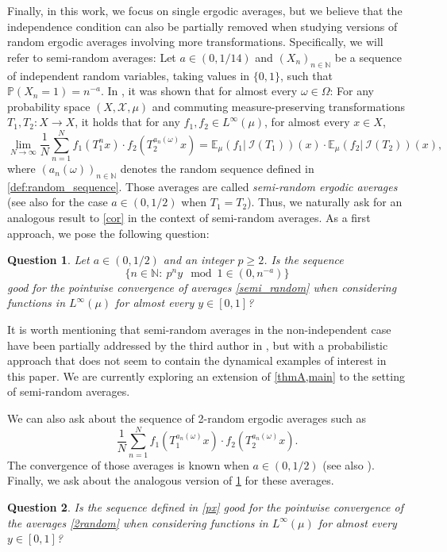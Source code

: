 \documentclass[11pt]{amsart}
\numberwithin{equation}{section}
\newtheorem{question}{Question}
\theoremstyle{definition}
\theoremstyle{plain}
\newcommand{\N}{{\mathbb N}}
\begin{document}
Finally, in this work, we focus on single ergodic averages, but we believe that the independence condition can also be partially removed when studying versions of random ergodic averages involving more transformations. Specifically, we will refer to semi-random averages: Let $a\in (0,1/14)$ and $(X_n)_{n\in\N}$ be a sequence of independent random variables, taking values in $\{0,1\}$, such that $\mathbb{P}(X_n=1)=n^{-a}$. In \cite{Frantzikinakis_Lesigne_Wierdl}, it was shown that for almost every $\omega\in \Omega$: For any probability space $(X,\mathcal{X},\mu)$ and commuting measure-preserving transformations $T_1,T_2\colon X\to X$, it holds that for any $f_1,f_2\in L^{\infty}(\mu)$, for almost every $x\in X$,
\begin{equation}\lim_{N\to\infty}\dfrac{1}{N}\sum_{n=1}^Nf_1(T_1^nx)\cdot f_2(T_2^{a_n(\omega)}x)=\mathbb{E}_\mu(f_1|\ \mathcal{I}(T_1))(x)\cdot\mathbb{E}_\mu(f_2|\ \mathcal{I}(T_2))(x),
    \label{semi_random}
\end{equation}
where $(a_n(\omega))_{n\in\N}$ denotes the random sequence defined in \cref{def:random_sequence}.
Those averages are called \emph{semi-random ergodic averages} (see also \cite{Frantzikinakis_Lesigne_Wierdl_Szemeredi} for the case $a\in (0,1/2)$ when $T_1=T_2$). Thus, we naturally ask for an analogous result to \cref{cor} in the context of semi-random averages. As a first approach, we pose the following question:
\begin{question}
    Let $a\in (0,1/2)$ and an integer $p\geq 2$. Is the sequence \begin{equation}
        \{n\in \N:\ p^ny\mod{1}\in (0,n^{-a})\}\label{px}
    \end{equation} good for the pointwise convergence of averages \eqref{semi_random} when considering functions in $L^\infty(\mu)$ for almost every $y\in [0,1]$?\label{Q:semi_random}
\end{question}
 It is worth mentioning that semi-random averages in the non-independent case have been partially addressed by the third author in \cite{Tesis}, but with a probabilistic approach that does not seem to contain the dynamical examples of interest in this paper. We are currently exploring an extension of \cref{thmA,main} to the setting of semi-random averages.

We can also ask about the sequence of 2-random ergodic averages such as
 \begin{equation}
     \dfrac{1}{N}\sum_{n=1}^Nf_1(T_1^{a_n(\omega)}x)\cdot f_2(T_2^{a_n(\omega)}x).\label{2random}
 \end{equation}
The convergence of those averages is known when $a\in (0,1/2)$  \cite{Frantzikinakis_Lesigne_Wierdl} (see also \cite{Frantzikinakis_Lesigne_Wierdl_Szemeredi}). Finally, we ask about the analogous version of  \cref{Q:semi_random} for these averages.
\begin{question}
    Is the sequence defined in \eqref{px} good for the pointwise convergence of the averages \eqref{2random} when considering functions in $L^\infty(\mu)$ for almost every $y\in [0,1]$?
\end{question}



\end{document}

